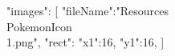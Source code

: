 {
	"images":
	[
		{
			"fileName":"Resources\\PokemonIcon\\1.png",
			"rect":
			{
				"x1":16,
				"y1":16,
			}
		}
	]
}